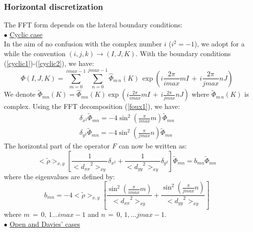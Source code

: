\subsubsection{Horizontal discretization}
The FFT form depends on the lateral boundary conditions:\\
$\bullet$ \underline{Cyclic case}\\
In the aim of no confusion with the complex number $i$ ($i^2 = -1$), we adopt
for a while the convention $(i, j, k) \rightarrow (I, J, K)$. With the boundary
conditions (\ref{cyclic1})-(\ref{cyclic2}), we have:
\begin{equation}
\label{foux1}
\Phi (I, J, K) =   \sum_{m=0}^{imax-1} \sum_{n=0}^{jmax-1}
\widehat{\Phi}_{m\, n}(K)\, \exp \left( i\frac {2\pi}{imax} m I \, + \,
i\frac {2\pi}{jmax} n J \right)
\end{equation}
We denote $\tilde{\Phi} _{m n}(K) = \widehat{\Phi} _{m n}(K)
\exp \left( i\frac {2\pi}{imax} m I \, + \, i\frac {2\pi}{jmax} n J \right) $ where
$\tilde{\Phi}_{m\, n}(K)$ is complex. Using the FFT decomposition
(\ref{foux1}), we have:\\
\begin{eqnarray*}
\delta _{x^2} \tilde{\Phi} _{m n} = - 4 \sin ^2 \left( \frac {\pi} {imax}
 m \right)     \tilde{\Phi} _{m n}  \\
\delta _{y^2} \tilde{\Phi}_{m n}  = - 4 \sin ^2 \left( \frac {\pi} {jmax}
 n \right)      \tilde{\Phi} _{m n}
\end{eqnarray*}
The horizontal part of the operator $F$ can now be written as:
\begin{equation}
\label{bmn}
<\tilde{\rho}>_{x, y} \left[ \dfrac {1} {<{d_{xx}}^2>_{xy}} \delta _{x^2}
+ \dfrac{1}{<{d_{yy}}^2>_{xy}}\delta _{y^2} \right]
\tilde{\Phi} _{m n} = b_{mn}  \tilde{\Phi}_{m n}
\end{equation}
where the eigenvalues are defined by:
\begin{displaymath}
b_{mn} = - 4 <\tilde{\rho}>_{x,y} \left[
\dfrac{\sin ^2 \left( \frac {\pi} {imax} m \right)} {<{d_{xx}}^2>_{xy}}   +
\dfrac{\sin ^2 \left( \frac {\pi} {jmax} n \right)} {<{d_{yy}}^2>_{xy}}
\right]
\end{displaymath}
where $m\,=\,0, \, 1...imax-1$ and $n\,=\,0,\, 1,...jmax-1$.\\
$\bullet$ \underline{Open and Davies' cases}\\
